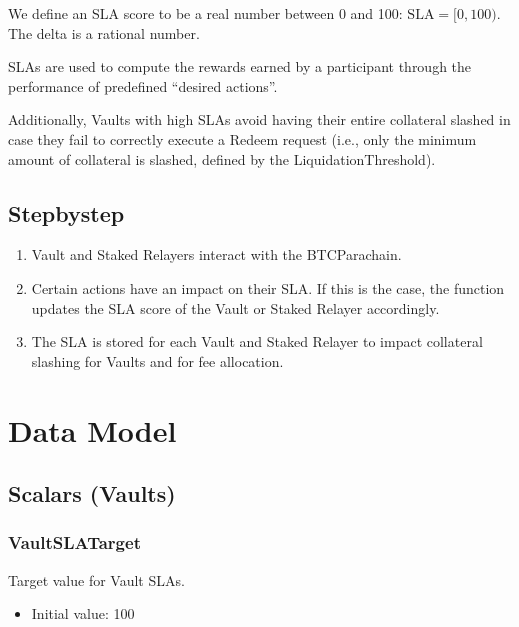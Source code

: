 \documentclass[a4paper,10pt,english]{sphinxmanual}
\begin{document}
We define an SLA score to be a real number between 0 and 100: \(\text{SLA} = [0, 100)\). The delta is a rational number.

SLAs are used to compute the rewards earned by a participant through the performance of predefined “desired actions”.

Additionally, Vaults with high SLAs avoid having their entire collateral slashed in case they fail to correctly execute a Redeem request (i.e., only the minimum amount of collateral is slashed, defined by the LiquidationThreshold).


\subsection{Step\sphinxhyphen{}by\sphinxhyphen{}step}
\label{\detokenize{spec/sla:step-by-step}}\begin{enumerate}
%
\item {} 
Vault and Staked Relayers interact with the BTC\sphinxhyphen{}Parachain.

\item {} 
Certain actions have an impact on their SLA. If this is the case, the function updates the SLA score of the Vault or Staked Relayer accordingly.

\item {} 
The SLA is stored for each Vault and Staked Relayer to impact collateral slashing for Vaults and for fee allocation.

\end{enumerate}


\section{Data Model}
\label{\detokenize{spec/sla:data-model}}

\subsection{Scalars (Vaults)}
\label{\detokenize{spec/sla:scalars-vaults}}

\subsubsection{VaultSLATarget}
\label{\detokenize{spec/sla:vaultslatarget}}
Target value for Vault SLAs.
\begin{itemize}
\item {} 
Initial value: 100

\end{itemize}
\end{document}
